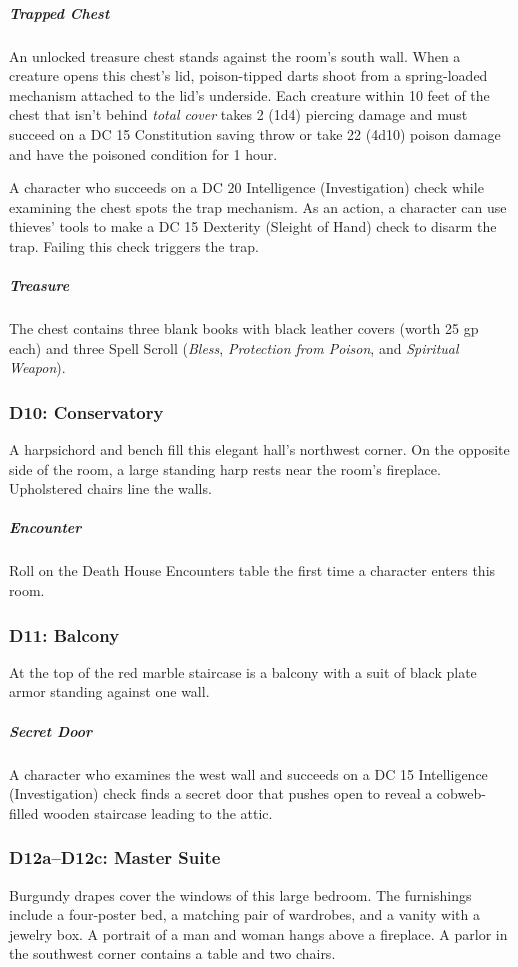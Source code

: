 \documentclass[10pt,a4paper,twoside,bg=print,twocolumn,openany,nodeprecatedcode]{dndbook}
\begin{document}
\subparagraph{Trapped Chest}
An unlocked treasure chest stands against the room's south wall. When a creature opens this chest's lid, poison-tipped darts shoot from a spring-loaded mechanism attached to the lid's underside. Each creature within 10 feet of the chest that isn't behind \textit{total cover} takes 2 (1d4) piercing damage and must succeed on a DC 15 Constitution saving throw or take 22 (4d10) poison damage and have the poisoned condition for 1 hour.

A character who succeeds on a DC 20 Intelligence (Investigation) check while examining the chest spots the trap mechanism. As an action, a character can use thieves' tools to make a DC 15 Dexterity (Sleight of Hand) check to disarm the trap. Failing this check triggers the trap.

\subparagraph{Treasure}
The chest contains three blank books with black leather covers (worth 25 gp each) and three Spell Scroll (\textit{Bless}, \textit{Protection from Poison}, and \textit{Spiritual Weapon}).

\subsubsection{D10: Conservatory}
\begin{DndReadAloud}{}
A harpsichord and bench fill this elegant hall's northwest corner. On the opposite side of the room, a large standing harp rests near the room's fireplace. Upholstered chairs line the walls.

\end{DndReadAloud}

\subparagraph{Encounter}
Roll on the Death House Encounters table the first time a character enters this room.

\subsubsection{D11: Balcony}
\begin{DndReadAloud}{}
At the top of the red marble staircase is a balcony with a suit of black plate armor standing against one wall.

\end{DndReadAloud}

\subparagraph{Secret Door}
A character who examines the west wall and succeeds on a DC 15 Intelligence (Investigation) check finds a secret door that pushes open to reveal a cobweb-filled wooden staircase leading to the attic.

\subsubsection{D12a–D12c: Master Suite}
\begin{DndReadAloud}{}
Burgundy drapes cover the windows of this large bedroom. The furnishings include a four-poster bed, a matching pair of wardrobes, and a vanity with a jewelry box. A portrait of a man and woman hangs above a fireplace. A parlor in the southwest corner contains a table and two chairs.

\end{DndReadAloud}
\end{document}
